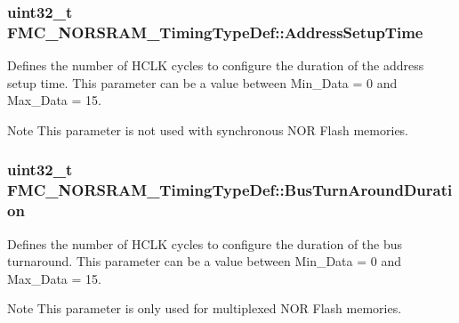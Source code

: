 \subsubsection[{\texorpdfstring{Address\+Setup\+Time}{AddressSetupTime}}]{\setlength{\rightskip}{0pt plus 5cm}uint32\+\_\+t F\+M\+C\+\_\+\+N\+O\+R\+S\+R\+A\+M\+\_\+\+Timing\+Type\+Def\+::\+Address\+Setup\+Time}\hypertarget{struct_f_m_c___n_o_r_s_r_a_m___timing_type_def_a3a22f760a9ddd85f0e256efa6d8ff8dd}{}\label{struct_f_m_c___n_o_r_s_r_a_m___timing_type_def_a3a22f760a9ddd85f0e256efa6d8ff8dd}
Defines the number of H\+C\+LK cycles to configure the duration of the address setup time. This parameter can be a value between Min\+\_\+\+Data = 0 and Max\+\_\+\+Data = 15. \begin{DoxyNote}{Note}
This parameter is not used with synchronous N\+OR Flash memories. 
\end{DoxyNote}
\subsubsection[{\texorpdfstring{Bus\+Turn\+Around\+Duration}{BusTurnAroundDuration}}]{\setlength{\rightskip}{0pt plus 5cm}uint32\+\_\+t F\+M\+C\+\_\+\+N\+O\+R\+S\+R\+A\+M\+\_\+\+Timing\+Type\+Def\+::\+Bus\+Turn\+Around\+Duration}\hypertarget{struct_f_m_c___n_o_r_s_r_a_m___timing_type_def_a430810aecc228ce17dd109c7a709da58}{}\label{struct_f_m_c___n_o_r_s_r_a_m___timing_type_def_a430810aecc228ce17dd109c7a709da58}
Defines the number of H\+C\+LK cycles to configure the duration of the bus turnaround. This parameter can be a value between Min\+\_\+\+Data = 0 and Max\+\_\+\+Data = 15. \begin{DoxyNote}{Note}
This parameter is only used for multiplexed N\+OR Flash memories. 
\end{DoxyNote}
